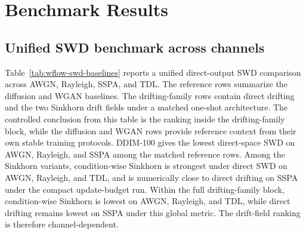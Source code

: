\documentclass[10pt,journal]{IEEEtran}
\begin{document}
\section{Benchmark Results}
\subsection{Unified SWD benchmark across channels}
Table~\ref{tab:wflow-swd-baselines} reports a unified direct-output SWD comparison across AWGN, Rayleigh, SSPA, and TDL.
The reference rows summarize the diffusion and WGAN baselines.
The drifting-family rows contain direct drifting and the two Sinkhorn drift fields under a matched one-shot architecture.
The controlled conclusion from this table is the ranking inside the drifting-family block, while the diffusion and WGAN rows provide reference context from their own stable training protocols.
DDIM-100 gives the lowest direct-space SWD on AWGN, Rayleigh, and SSPA among the matched reference rows.
Among the Sinkhorn variants, condition-wise Sinkhorn is strongest under direct SWD on AWGN, Rayleigh, and TDL, and is numerically close to direct drifting on SSPA under the compact update-budget run.
Within the full drifting-family block, condition-wise Sinkhorn is lowest on AWGN, Rayleigh, and TDL, while direct drifting remains lowest on SSPA under this global metric.
The drift-field ranking is therefore channel-dependent.

\end{document}
